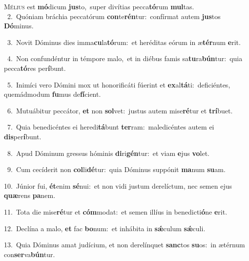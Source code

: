 \lettrine{\initial\textcolor{\initialcolor}{M}}{élius} est \textbf{mó}\-dicum \textbf{jus}\-to,~\star super divítias pecca\-\textbf{tó}\-rum \textbf{mul}\-tas.\\
{\numbfont\textcolor{\numbcolor}{~2.}}~Quóniam bráchia peccatórum \textbf{con}\-te\-\textbf{rén}\-tur:~\star confírmat autem \textbf{jus}\-tos \textbf{Dó}\-minus.\par
{\numbfont\textcolor{\numbcolor}{~3.}}~Novit Dóminus dies imma\-\textbf{cu}\-la\-\textbf{tó}\-rum:~\star et heréditas eórum in æ\-\textbf{tér}\-num \textbf{e}\-rit.\par
{\numbfont\textcolor{\numbcolor}{~4.}}~Non confundéntur in témpore malo,~\dagger et in diébus famis sa\-\textbf{tu}\-ra\-\textbf{bún}\-tur:~\star quia pecca\-\textbf{tó}\-res per\-\textbf{í}\-bunt.\par
{\numbfont\textcolor{\numbcolor}{~5.}}~Inimíci vero Dómini mox ut honorificáti fúerint et \textbf{ex}\-al\-\textbf{tá}\-ti:~\star deficiéntes, quemádmodum \textbf{fu}\-mus de\-\textbf{fí}\-cient.\par
{\numbfont\textcolor{\numbcolor}{~6.}}~Mutuábitur peccátor, \textbf{et} non \textbf{sol}\-vet:~\star justus autem mise\-\textbf{ré}\-tur et \textbf{trí}\-buet.\par
{\numbfont\textcolor{\numbcolor}{~7.}}~Quia benedicéntes ei heredi\-\textbf{tá}\-bunt \textbf{ter}\-ram:~\star maledicéntes autem ei \textbf{dis}\-per\-\textbf{í}\-bunt.\par
{\numbfont\textcolor{\numbcolor}{~8.}}~Apud Dóminum gressus hóminis \textbf{di}\-ri\-\textbf{gén}\-tur:~\star et viam \textbf{e}\-jus \textbf{vo}\-let.\par
{\numbfont\textcolor{\numbcolor}{~9.}}~Cum cecíderit non \textbf{col}\-li\-\textbf{dé}\-tur:~\star quia Dóminus suppónit \textbf{ma}\-num \textbf{su}\-am.\par
{\numbfont\textcolor{\numbcolor}{10.}}~Júnior fui, \textbf{ét}\-enim \textbf{sé}\-nui:~\star et non vidi justum derelíctum, nec semen ejus \textbf{quæ}\-rens \textbf{pa}\-nem.\par
{\numbfont\textcolor{\numbcolor}{11.}}~Tota die mise\-\textbf{ré}\-tur et \textbf{cóm}\-modat:~\star et semen illíus in benedicti\-\textbf{ó}\-ne \textbf{e}\-rit.\par
{\numbfont\textcolor{\numbcolor}{12.}}~Declína a malo, \textbf{et} fac \textbf{bo}\-num:~\star et inhábita in \textbf{sǽ}\-culum \textbf{sǽ}\-culi.\par
{\numbfont\textcolor{\numbcolor}{13.}}~Quia Dóminus amat judícium, et non derelínquet \textbf{sanc}\-tos \textbf{su}\-os:~\star in ætérnum con\-\textbf{ser}\-va\-\textbf{bún}\-tur.\par
